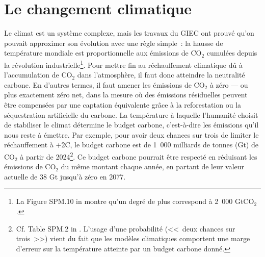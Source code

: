 \documentclass[a5paper,french,openany]{memoir}
\begin{document}
\section{Le changement climatique}

Le climat est un système complexe, mais les travaux du GIEC ont prouvé qu'on pouvait approximer son évolution avec une règle simple~: la hausse de température mondiale est proportionnelle aux émissions de CO$_\text{2}$ cumulées depuis la révolution industrielle\footnote{La Figure SPM.10 in \citet{ipcc_climate_2021} montre qu'un degré de plus correspond à 2~000 GtCO$_\text{2}$.}. 
Pour mettre fin au réchauffement climatique dû à l'accumulation de CO$_\text{2}$ dans l'atmosphère, il faut donc atteindre la neutralité carbone. En d'autres termes, il faut amener les émissions de CO$_\text{2}$ à zéro --- ou plus exactement zéro net, dans la mesure où des émissions résiduelles peuvent être compensées par une captation équivalente grâce à la reforestation ou la séquestration artificielle du carbone. La température à laquelle l'humanité choisit de stabiliser le climat détermine le budget carbone, c'est-à-dire les émissions qu'il nous reste à émettre. Par exemple, pour avoir deux chances sur trois de limiter le réchauffement à +2\textdegree{}C, le budget carbone est de 1~000 milliards de tonnes (Gt) de CO$_\text{2}$ à partir de 2024\footnote{Cf. Table SPM.2 in \citet{ipcc_climate_2021}. L'usage d'une probabilité (<<~deux chances sur trois~>>) vient du fait que les modèles climatiques comportent une marge d'erreur sur la température atteinte par un budget carbone donné.}. 
Ce budget carbone pourrait être respecté en réduisant les émissions de CO$_\text{2}$ du même montant chaque année, en partant de leur valeur actuelle de 38 Gt jusqu'à zéro en 2077. 
\end{document}
